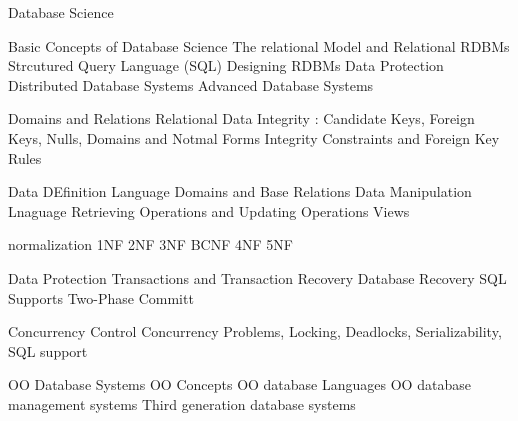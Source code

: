 Database Science

Basic Concepts of Database Science
The relational Model and Relational RDBMs
Strcutured Query Language (SQL)
Designing RDBMs
Data Protection
Distributed Database Systems
Advanced Database Systems


Domains and Relations
Relational Data Integrity : Candidate Keys, Foreign Keys, Nulls, Domains and Notmal Forms
Integrity Constraints and Foreign Key Rules


Data DEfinition Language
Domains and Base Relations
Data Manipulation Lnaguage
Retrieving Operations and Updating Operations
Views



normalization
1NF
2NF
3NF
BCNF
4NF
5NF

Data Protection
Transactions and Transaction Recovery
Database Recovery
SQL Supports
Two-Phase Committ

Concurrency Control
Concurrency Problems, Locking, Deadlocks, Serializability, SQL support

OO Database Systems
OO Concepts
OO database Languages
OO database management systems
Third generation database systems
